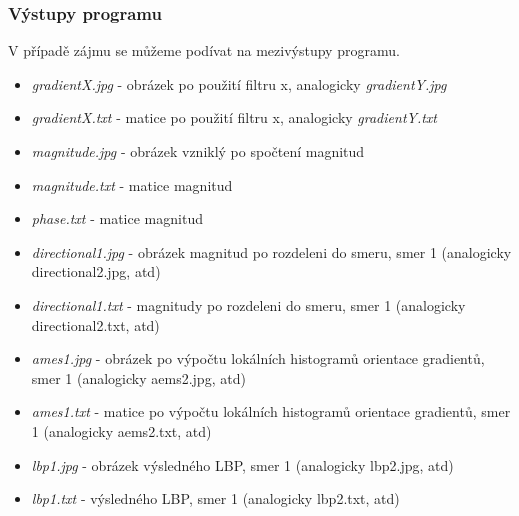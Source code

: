 \documentclass{report}
\begin{document}
\subsubsection{Výstupy programu}
V případě zájmu se můžeme podívat na mezivýstupy programu.
\begin{itemize}
	\item \textit{gradientX.jpg} - obrázek po použití filtru x, analogicky \textit{gradientY.jpg}
	\item \textit{gradientX.txt} - matice po použití filtru x, analogicky \textit{gradientY.txt} 
	\item \textit{magnitude.jpg} - obrázek vzniklý po spočtení magnitud
	\item \textit{magnitude.txt} - matice magnitud 
	\item \textit{phase.txt} - matice magnitud 
	\item \textit{directional1.jpg} - obrázek magnitud po rozdeleni do smeru, smer 1 (analogicky directional2.jpg, atd)
	\item \textit{directional1.txt} - magnitudy po rozdeleni do smeru, smer 1 (analogicky directional2.txt, atd)
	\item \textit{ames1.jpg} - obrázek po výpočtu lokálních histogramů orientace gradientů, smer 1 (analogicky aems2.jpg, atd)
	\item \textit{ames1.txt} - matice po výpočtu lokálních histogramů orientace gradientů, smer 1 (analogicky aems2.txt, atd)
	\item \textit{lbp1.jpg} - obrázek výsledného LBP, smer 1 (analogicky lbp2.jpg, atd)
	\item \textit{lbp1.txt} - výsledného LBP, smer 1 (analogicky lbp2.txt, atd)
\end{itemize}


\end{document}
